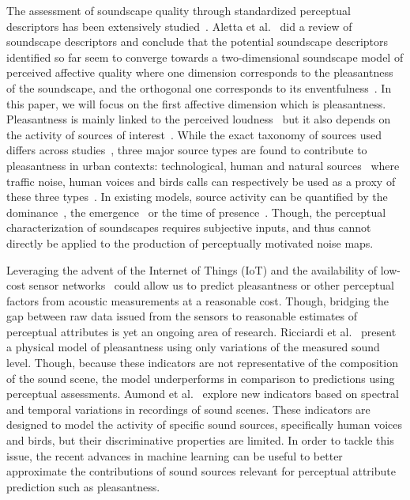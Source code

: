 \documentclass[11pt,a4paper]{article}
\begin{document}
The assessment of soundscape quality through standardized perceptual descriptors has been extensively studied~\cite{viollon2000, axelsson2010, cain2013, jeon2018, aletta2016}. Aletta et al.~\cite{aletta2016} did a review of soundscape descriptors and conclude that the potential soundscape descriptors identified so far seem to converge towards a two-dimensional soundscape model of perceived affective quality where one dimension corresponds to the pleasantness of the soundscape, and the orthogonal one corresponds to its enventfulness~\cite{axelsson2010, aumond2017, delaitre2014}. In this paper, we will focus on the first affective dimension which is pleasantness. Pleasantness is mainly linked to the perceived loudness~\cite{blauert1997, jekosch2004} but it also depends on the activity of sources of interest~\cite{nilsson2007, perez2012}. While the exact taxonomy of sources used differs across studies~\cite{guastavino2007, gygi2007, salamon2014, brown2011}, three major source types are found to contribute to pleasantness in urban contexts: technological, human and natural sources~\cite{nilsson2007, axelsson2010} where traffic noise, human voices and birds calls can respectively be used as a proxy of these three types~\cite{lavandier2006, ricciardi2014, aumond2017}. In existing models, source activity can be quantified by the dominance~\cite{hong2017}, the emergence~\cite{guastavino2006} or the time of presence~\cite{ricciardi2014}. Though, the perceptual characterization of soundscapes requires subjective inputs, and thus cannot directly be applied to the production of perceptually motivated noise maps.

Leveraging the advent of the Internet of Things (IoT) and the availability of low-cost sensor networks~\cite{ardouin2018, mydlarz2017} could allow us to predict pleasantness or other perceptual factors from acoustic measurements at a reasonable cost. Though, bridging the gap between raw data issued from the sensors to reasonable estimates of perceptual attributes is yet an ongoing area of research. Ricciardi et al.~\cite{ricciardi2014} present a physical model of pleasantness using only variations of the measured sound level. Though, because these indicators are not representative of the composition of the sound scene, the model underperforms in comparison to predictions using perceptual assessments. Aumond et al.~\cite{aumond2017} explore new indicators based on spectral and temporal variations in recordings of sound scenes. These indicators are designed to model the activity of specific sound sources, specifically human voices and birds, but their discriminative properties are limited. In order to tackle this issue, the recent advances in machine learning can be useful to better approximate the contributions of sound sources relevant for perceptual attribute prediction such as pleasantness.
\end{document}
